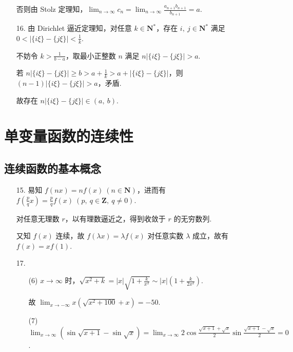 \documentclass[oneside]{ctexbook} %
\begin{document}
\begin{enumerate}
    否则由 Stolz 定理知，$\displaystyle\lim_{n \to \infty} c_n = \lim_{n\to \infty} \frac{a_{n+1}b_{n+1}}{b_{n+1}} = a$.
    \item[16.]
    由 Dirichlet 逼近定理知，对任意 $k \in \mathbf{N^*}$，存在 $i,\ j \in \mathbf{N^*}$ 满足 $0<|\{ i\xi \}-\{ j\xi \}|<\frac 1 k$.
    
    不妨令 $k>\frac 1 {b-a}$，取最小正整数 $n$ 满足 $n|\{ i\xi \}-\{ j\xi \}|>a$.
    
    若 $n|\{ i\xi \}-\{ j\xi \}| \geqslant b > a + \frac 1 k > a + |\{ i\xi \}-\{ j\xi \}|$，则 $(n-1)|\{ i\xi \}-\{ j\xi \}|>a$，矛盾.
    
    故存在 $n|\{ i\xi \}-\{ j\xi \}| \in (a,\ b)$.
\end{enumerate}

\newpage

\chapter{单变量函数的连续性}

\section{连续函数的基本概念}

\begin{enumerate}
    \item[15.]
    易知 $f(nx) = nf(x) \ (n \in \mathbf{N})$，进而有 $f\left(\frac p q x\right) = \frac p q f(x) \ (p,\ q \in \mathbf{Z},\ q \neq 0)$.
    
    对任意无理数 $r$，以有理数逼近之，得到收敛于 $r$ 的无穷数列.
    
    又知 $f(x)$ 连续，故 $f(\lambda x) = \lambda f(x)$ 对任意实数 $\lambda$ 成立，故有 $f(x) = x f(1)$.
    \item[17.]
    \begin{enumerate}
        \item[(6)]
        $x \to \infty$ 时，$\sqrt{x^2+k} = |x| \sqrt{1+\frac k {x^2}} \sim |x|(1+\frac k {2x^2})$.
        
        故 $\displaystyle\lim_{x \to -\infty} x(\sqrt{x^2+100}+x) = -50$.
        \item[(7)]
        $\displaystyle\lim_{x \to \infty} \left( \sin\sqrt{x+1} - \sin\sqrt x \right) = \lim_{x \to \infty} 2 \cos{\frac {\sqrt{x+1}+\sqrt x} 2}\sin{\frac {\sqrt{x+1}-\sqrt x} 2} = 0$.
    \end{enumerate}
\end{enumerate}
\end{document}
